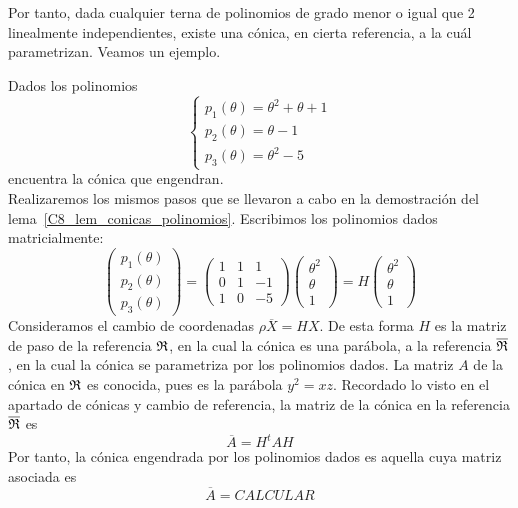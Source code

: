 Por tanto, dada cualquier terna de polinomios de grado menor o igual que 2 linealmente independientes, existe una cónica, en cierta referencia, a la cuál parametrizan. Veamos un ejemplo.
\begin{exa}
 	Dados los polinomios 
 	\[\begin{cases}
 		p_1(\theta)=\theta^2+\theta+1\\
 		p_2(\theta)=\theta-1\\
 		p_3(\theta)=\theta^2-5
 	\end{cases}\]
 	encuentra la cónica que engendran.\\
 	
 	Realizaremos los mismos pasos que se llevaron a cabo en la demostración del lema~\ref{C8_lem_conicas_polinomios}. Escribimos los polinomios dados matricialmente:
 	\begin{equation*}
 		\left( \begin{array}{c}
 			p_1(\theta)\\p_2(\theta)\\p_3(\theta)
 		\end{array}\right)=
 		\left( \begin{array}{ccc}
 			1&1&1\\
 			0&1&-1\\
 			1&0&-5
 		\end{array}\right) 
 		\left( \begin{array}{c}
 			\theta^2\\\theta\\1
 		\end{array}\right)=H
 		\left( \begin{array}{c}
 			\theta^2\\\theta\\1
 		\end{array}\right)
 	\end{equation*}
 	Consideramos el cambio de coordenadas $\rho \overline{X}=HX$. De esta forma $H$ es la matriz de paso de la referencia $\mathfrak{R}$, en la cual la cónica es una parábola, a la referencia $\overline{\mathfrak{R}}$, en la cual la cónica se parametriza por los polinomios dados. La matriz $A$ de la cónica en $\mathfrak{R}$ es conocida, pues es la parábola $y^2=xz$. Recordado lo visto en el apartado de cónicas y cambio de referencia, la matriz de la cónica en la referencia $\overline{\mathfrak{R}}$ es
 	\begin{equation}
	 	\overline{A}=H^tAH
 	\end{equation}
 	Por tanto, la cónica engendrada por los polinomios dados es aquella cuya matriz asociada es
 	\begin{equation*}
	 	\overline{A}=CALCULAR
 	\end{equation*}
\end{exa}
